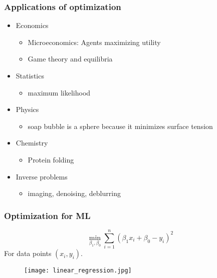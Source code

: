 \documentclass{beamer}
\begin{document}
\begin{frame}
  \frametitle{Applications of optimization}

  \begin{itemize}
    \item Economics
          \begin{itemize}
            \item Microeconomics: Agents maximizing utility
            \item Game theory and equilibria
          \end{itemize}
    \item Statistics
          \begin{itemize}
            \item maximum likelihood
          \end{itemize}
    \item Physics
          \begin{itemize}
            \item soap bubble is a sphere because it minimizes surface tension
          \end{itemize}
    \item Chemistry
          \begin{itemize}
            \item Protein folding
          \end{itemize}
    \item Inverse problems
          \begin{itemize}
            \item imaging, denoising, deblurring
          \end{itemize}
  \end{itemize}

\end{frame}

\begin{frame}
  \frametitle{Optimization for ML}
  \begin{minipage}{0.5\textwidth}
    \begin{equation}
      \min_{\beta_1, \beta_0} \sum_{i=1}^{n} {( \beta_1 x_i + \beta_0 - y_i)}^2
    \end{equation}
    For data points $(x_i, y_i)$.
  \end{minipage}
  \hfill
  \begin{minipage}{0.45\textwidth}
    \begin{figure}[ht]
      \centering
      \texttt{[image: linear\_regression.jpg]}
    \end{figure}

  \end{minipage}


\end{frame}
\end{document}
